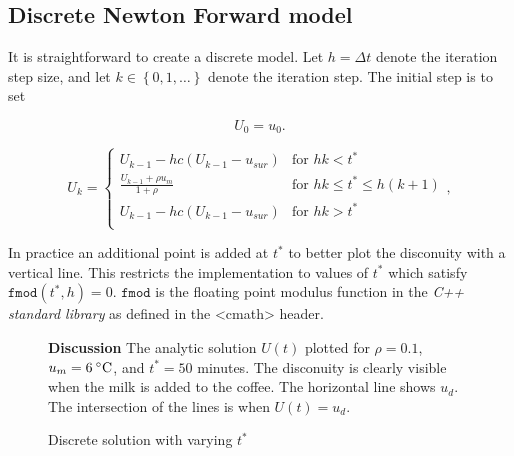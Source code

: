 \documentclass[11pt,oneside]{extarticle}
\newcommand{\Celsius}{\:\degree\mathrm{C}}
\numberwithin{equation}{section}
\numberwithin{figure}{section}
\begin{document}
\subsection{Discrete Newton Forward model}

\par It is straightforward to create a discrete model. Let $h=\Delta t$ denote
the iteration step size, and let $k\in\left\lbrace0,1,\ldots\right\rbrace$ denote 
the iteration step. The initial step is to set

$$
U_0 = u_0.
$$

\begin{equation}
    U_{k} = 
    \begin{cases}
        U_{k-1} - hc( U_{k-1} - u_{sur} ) & \text{for } hk < t^* \\
        \frac{U_{k-1} + \rho u_m}{1+\rho} & \text{for } hk \leq t^* \leq h(k+1) \\
        U_{k-1} - hc( U_{k-1} - u_{sur} ) & \text{for } hk > t^* \\
\end{cases},
\end{equation}

In practice an additional point is added at $t^*$ to better 
plot the disconuity with a vertical line. This restricts the implementation to values
of $t^*$ which satisfy $\mathtt{fmod}(t^*, h) = 0$. $\mathtt{fmod}$ is the
floating point modulus function in the \emph{C++ standard library} as defined in
the {\ttfamily<cmath>} header.

\begin{figure}[H]
    \caption{Discrete solution with varying $t^*$}
    \label{fig:analytic}
    \begin{center}
        {\graphicspath{{./figures/}}
        } 
        
        \scriptsize{ {\bf Discussion} The analytic solution $U(t)$ plotted for $\rho = 0.1$,
        $u_{m} = 6\Celsius$, and $t^* = 50$ minutes. The disconuity is clearly visible when
        the milk is added to the coffee. The horizontal line shows $u_d$. The intersection
        of the lines is when $U(t)=u_d$.}
    \end{center}
\end{figure}
\end{document}
